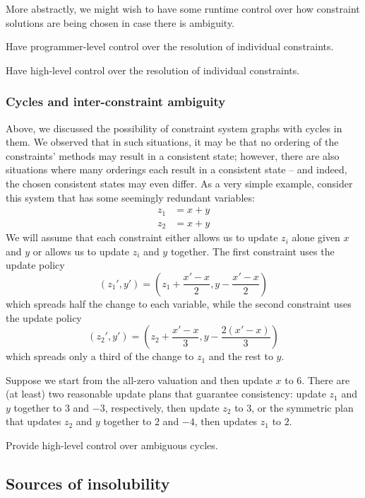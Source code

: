 More abstractly, we might wish to have some runtime control over how
constraint solutions are being chosen in case there is ambiguity.

\begin{desiderata}
    Have programmer-level control over the resolution of individual
    constraints.
\end{desiderata}
\begin{desiderata}
    Have high-level control over the resolution of individual constraints.
\end{desiderata}

\subsubsection{Cycles and inter-constraint ambiguity}
Above, we discussed the possibility of constraint system graphs with cycles
in them. We observed that in such situations, it may be that no ordering of
the constraints' methods may result in a consistent state; however, there
are also situations where many orderings each result in a consistent state
-- and indeed, the chosen consistent states may even differ. As a very
simple example, consider this system that has some seemingly redundant
variables:
\begin{align*}
    z_1 &= x+y \\
    z_2 &= x+y
\end{align*}
We will assume that each constraint either allows us to update $z_i$ alone
given $x$ and $y$ or allows us to update $z_i$ and $y$ together. The first
constraint uses the update policy
\[(z_1',y') = \left(z_1 + \frac{x'-x}2, y - \frac{x'-x}2\right)\]
which spreads half the change to each variable, while the second constraint
uses the update policy
\[(z_2',y') = \left(z_2 + \frac{x'-x}3, y - \frac{2(x'-x)}3\right)\]
which spreads only a third of the change to $z_1$ and the rest to $y$.

Suppose we start from the all-zero valuation and then update $x$ to $6$.
There are (at least) two reasonable update plans that guarantee consistency:
update $z_1$ and $y$ together to $3$ and $-3$, respectively, then update
$z_2$ to $3$, or the symmetric plan that updates $z_2$ and $y$ together to
$2$ and $-4$, then updates $z_1$ to $2$.

\begin{desiderata}
    Provide high-level control over ambiguous cycles.
\end{desiderata}

\subsection{Sources of insolubility}
